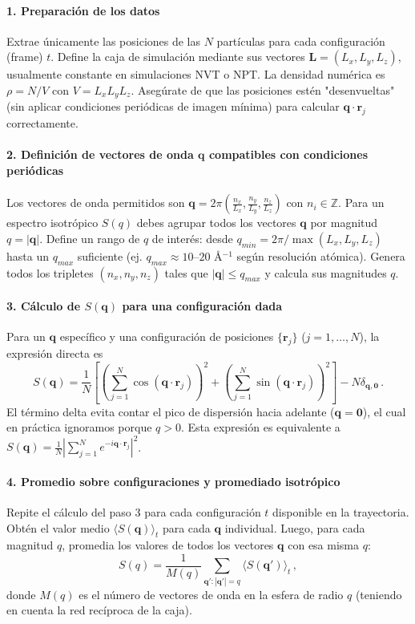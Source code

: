 \documentclass{tufte-handout}
\begin{document}
\paragraph{1. Preparación de los datos}
Extrae únicamente las posiciones de las $N$ partículas para cada configuración (frame) $t$.  
Define la caja de simulación mediante sus vectores $\mathbf{L} = (L_x, L_y, L_z)$, usualmente constante en simulaciones NVT o NPT.  
La densidad numérica es $\rho = N / V$ con $V = L_x L_y L_z$.  
Asegúrate de que las posiciones estén "desenvueltas" (sin aplicar condiciones periódicas de imagen mínima) para calcular $\mathbf{q} \cdot \mathbf{r}_j$ correctamente.

\paragraph{2. Definición de vectores de onda $\mathbf{q}$ compatibles con condiciones periódicas}
Los vectores de onda permitidos son $\mathbf{q} = 2\pi \left( \frac{n_x}{L_x}, \frac{n_y}{L_y}, \frac{n_z}{L_z} \right)$ con $n_i \in \mathbb{Z}$.  
Para un espectro isotrópico $S(q)$ debes agrupar todos los vectores $\mathbf{q}$ por magnitud $q = |\mathbf{q}|$.  
Define un rango de $q$ de interés: desde $q_{min} = 2\pi / \max(L_x,L_y,L_z)$ hasta un $q_{max}$ suficiente (ej. $q_{max} \approx 10$–$20$ Å$^{-1}$ según resolución atómica).  
Genera todos los tripletes $(n_x, n_y, n_z)$ tales que $|\mathbf{q}| \leq q_{max}$ y calcula sus magnitudes $q$.

\paragraph{3. Cálculo de $S(\mathbf{q})$ para una configuración dada}
Para un $\mathbf{q}$ específico y una configuración de posiciones $\{\mathbf{r}_j\}$ ($j=1,\dots,N$), la expresión directa es  
$$ S(\mathbf{q}) = \frac{1}{N} \left[ \left( \sum_{j=1}^N \cos(\mathbf{q}\cdot\mathbf{r}_j) \right)^2 + \left( \sum_{j=1}^N \sin(\mathbf{q}\cdot\mathbf{r}_j) \right)^2 \right] - N\delta_{\mathbf{q},\mathbf{0}} \,. $$  
El término delta evita contar el pico de dispersión hacia adelante ($\mathbf{q}=\mathbf{0}$), el cual en práctica ignoramos porque $q>0$.  
Esta expresión es equivalente a $S(\mathbf{q}) = \frac{1}{N} \left| \sum_{j=1}^N e^{-i\mathbf{q}\cdot\mathbf{r}_j} \right|^2$.

\paragraph{4. Promedio sobre configuraciones y promediado isotrópico}
Repite el cálculo del paso 3 para cada configuración $t$ disponible en la trayectoria.  
Obtén el valor medio $\langle S(\mathbf{q}) \rangle_t$ para cada $\mathbf{q}$ individual.  
Luego, para cada magnitud $q$, promedia los valores de todos los vectores $\mathbf{q}$ con esa misma $q$:  
$$ S(q) = \frac{1}{M(q)} \sum_{\mathbf{q}' : |\mathbf{q}'|=q} \langle S(\mathbf{q}') \rangle_t \,, $$  
donde $M(q)$ es el número de vectores de onda en la esfera de radio $q$ (teniendo en cuenta la red recíproca de la caja).
\end{document}
